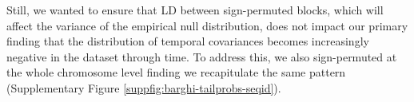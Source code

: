 \documentclass[11pt]{article}
\newcommand{\E}{\mathbb{E}}
\DeclareMathOperator{\var}{Var}
\DeclareMathOperator{\cov}{Cov}
\begin{document}
{Still, we wanted to ensure that LD between sign-permuted blocks, which will
affect the variance of the empirical null distribution, does not impact our
primary finding that the distribution of temporal covariances becomes
increasingly negative in the \textcite{Barghi2019-qy} dataset through time. To
address this, we also sign-permuted at the whole chromosome level finding we
recapitulate the same pattern (Supplementary Figure
\ref{suppfig:barghi-tailprobs-seqid}).







}
\end{document}
